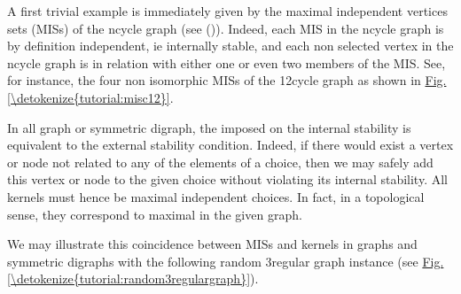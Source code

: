 \documentclass[a4paper,10pt,english]{sphinxhowto}
\begin{document}
A first trivial example is immediately given by the maximal independent vertices sets (MISs) of the n\sphinxhyphen{}cycle graph (see {\hyperref[\detokenize{tutorial:isomorphicmis-tutorial-label}]{}} ()). Indeed, each MIS in the n\sphinxhyphen{}cycle graph is by definition independent, ie internally stable, and each non selected vertex in the n\sphinxhyphen{}cycle graph is in relation with either one or even two members of the MIS. See, for instance, the four non isomorphic MISs of the 12\sphinxhyphen{}cycle graph as shown in \hyperref[\detokenize{tutorial:misc12}]{Fig.\@ \ref{\detokenize{tutorial:misc12}}}.

In all graph or symmetric digraph, the  imposed on the internal stability is equivalent to the external stability condition. Indeed, if there would exist a vertex or node not related to any of the elements of a choice, then we may safely add this vertex or node to the given choice without violating its internal stability. All kernels must hence be maximal independent choices. In fact, in a topological sense, they correspond to maximal  in the given graph.

We may illustrate this coincidence between MISs and kernels in graphs
and symmetric digraphs with the following random 3\sphinxhyphen{}regular graph
instance (see \hyperref[\detokenize{tutorial:random3regulargraph}]{Fig.\@ \ref{\detokenize{tutorial:random3regulargraph}}}).

\begin{sphinxVerbatim}[commandchars=\\\{\},numbers=left,firstnumber=1,stepnumber=1]
   
  
\end{sphinxVerbatim}
\end{document}
